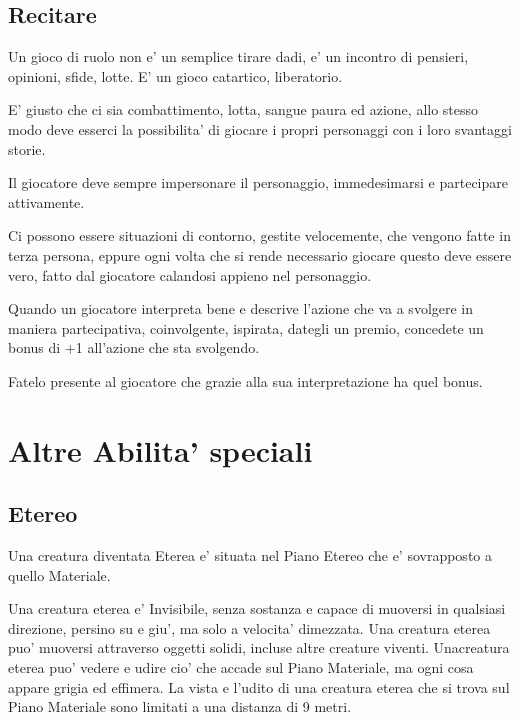 \documentclass[a4paper,11pt,twoside,openany]{book}
\begin{document}
{		\subsection{Recitare}
		
		\label{recitare}
		
		Un gioco di ruolo non e' un semplice tirare dadi, e' un incontro di pensieri, opinioni, sfide, lotte. E' un gioco catartico, liberatorio.
		
		E' giusto che ci sia combattimento, lotta, sangue paura ed azione, allo stesso modo deve esserci la possibilita' di giocare i propri personaggi con i loro svantaggi storie.
		
		Il giocatore deve sempre impersonare il personaggio, immedesimarsi e partecipare attivamente.
		
		Ci possono essere situazioni di contorno, gestite velocemente, che vengono fatte in terza persona, eppure ogni volta che si rende necessario giocare questo deve essere vero, fatto dal giocatore calandosi appieno nel personaggio.
		
		Quando un giocatore interpreta bene e descrive l'azione che va a svolgere in maniera partecipativa, coinvolgente, ispirata, dategli un premio, concedete un bonus di +1 all'azione che sta svolgendo.
		
		Fatelo presente al giocatore che grazie alla sua interpretazione ha quel bonus.
		
		\pagebreak
		
		\section{Altre Abilita' speciali}
		
		\label{altre-abilita-speciali}
		
		\subsection{Etereo}
		
		\label{etereo}
		
		Una creatura diventata Eterea e' situata nel Piano Etereo che e' sovrapposto a quello Materiale.
		
		Una creatura eterea e' Invisibile, senza sostanza e capace di muoversi in qualsiasi direzione, persino su e giu', ma solo a velocita' dimezzata. Una creatura eterea puo' muoversi attraverso oggetti solidi, incluse altre creature viventi. Unacreatura eterea puo' vedere e udire cio' che accade sul Piano Materiale, ma ogni cosa appare grigia ed effimera. La vista e l'udito di una creatura eterea che si trova sul Piano Materiale sono limitati a una distanza di 9 metri.
		
}
\end{document}
